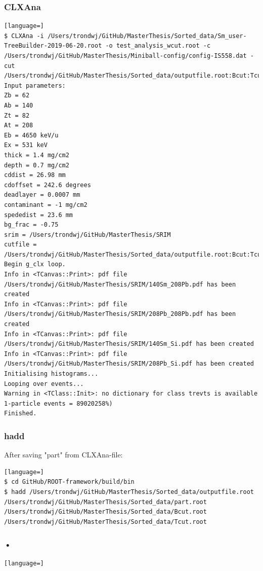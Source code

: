 \documentclass[twoside,english]{uiofysmaster/uiofysmaster}
\begin{document}
\subsubsection{CLXAna}
\begin{lstlisting}[language=]
$ CLXAna -i /Users/trondwj/GitHub/MasterThesis/Sorted_data/Sm_user-TreeBuilder-2019-06-20.root -o test_analysis_wcut.root -c /Users/trondwj/GitHub/MasterThesis/Miniball-config/config-IS558.dat -cut /Users/trondwj/GitHub/MasterThesis/Sorted_data/outputfile.root:Bcut:Tcut
Input parameters:
Zb = 62
Ab = 140
Zt = 82
At = 208
Eb = 4650 keV/u
Ex = 531 keV
thick = 1.4 mg/cm2
depth = 0.7 mg/cm2
cddist = 26.98 mm
cdoffset = 242.6 degrees
deadlayer = 0.0007 mm
contaminant = -1 mg/cm2
spededist = 23.6 mm
bg_frac = -0.75
srim = /Users/trondwj/GitHub/MasterThesis/SRIM
cutfile = /Users/trondwj/GitHub/MasterThesis/Sorted_data/outputfile.root:Bcut:Tcut
Begin g_clx loop.
Info in <TCanvas::Print>: pdf file /Users/trondwj/GitHub/MasterThesis/SRIM/140Sm_208Pb.pdf has been created
Info in <TCanvas::Print>: pdf file /Users/trondwj/GitHub/MasterThesis/SRIM/208Pb_208Pb.pdf has been created
Info in <TCanvas::Print>: pdf file /Users/trondwj/GitHub/MasterThesis/SRIM/140Sm_Si.pdf has been created
Info in <TCanvas::Print>: pdf file /Users/trondwj/GitHub/MasterThesis/SRIM/208Pb_Si.pdf has been created
Initialising histograms...
Looping over events...
Warning in <TClass::Init>: no dictionary for class trevts is available
1-particle events = 89020258%)    
Finished.
\end{lstlisting}


\subsubsection{hadd}
After saving "part" from CLXAna-file:
\begin{lstlisting}[language=]
$ cd GitHub/ROOT-framework/build/bin
$ hadd /Users/trondwj/GitHub/MasterThesis/Sorted_data/outputfile.root /Users/trondwj/GitHub/MasterThesis/Sorted_data/part.root /Users/trondwj/GitHub/MasterThesis/Sorted_data/Bcut.root /Users/trondwj/GitHub/MasterThesis/Sorted_data/Tcut.root 
\end{lstlisting}


\subsubsection{•}
\begin{lstlisting}[language=]
\end{lstlisting}
\end{document}
